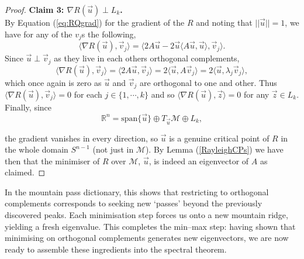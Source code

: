 \begin{proof}
\textbf{Claim 3: $\nabla R(\vec{u}) \perp L_k$.} \\
By Equation (\ref{eq:RQgrad}) for the gradient of the $R$ and noting that $||\vec{u}||=1$, we have for any of the $v_j$s the following, $$\langle \nabla R(\vec{u}), \vec{v}_j \rangle = \langle 2A\vec{u} - 2\vec{u}\langle A\vec{u}, \vec{u} \rangle, \vec{v}_j\rangle.$$ Since $\vec{u}\perp\vec{v}_j$ as they live in each others orthogonal complements, $$\langle \nabla R(\vec{u}), \vec{v}_j \rangle = \langle 2A\vec{u}, \vec{v}_j\rangle = 2\langle \vec{u}, A\vec{v}_j\rangle = 2\langle \vec{u}, \lambda_j\vec{v}_j\rangle,$$ which once again is zero as $\vec{u}$ and $\vec{v}_j$ are orthogonal to one and other. Thus $\langle \nabla R(\vec{u}), \vec{v}_j \rangle = 0$ for each $j \in \{1,\cdots,k\}$ and so $\langle \nabla R(\vec{u}), \vec{z} \rangle = 0$ for any $\vec{z} \in L_k$. \\

\noindent Finally, since $$\mathbb{R}^n = \text{span}\{\vec{u}\} \oplus T_{\vec{u}}\mathcal{M} \oplus L_k,$$

\noindent the gradient vanishes in every direction, so $\vec u$ is a genuine critical point of $R$ in the whole domain $S^{n-1}$ (not just in $\mathcal{M}$). By Lemma (\ref{RayleighCPs}) we have then that the minimiser of $R$ over $\mathcal{M}$, $\vec{u}$, is indeed an eigenvector of $A$ as claimed.
\end{proof}

\noindent In the mountain pass dictionary, this shows that restricting to orthogonal complements corresponds to seeking new ‘passes’ beyond the previously discovered peaks. Each minimisation step forces us onto a new mountain ridge, yielding a fresh eigenvalue. This completes the min–max step: having shown that minimising on orthogonal complements generates new eigenvectors, we are now ready to assemble these ingredients into the spectral theorem.

